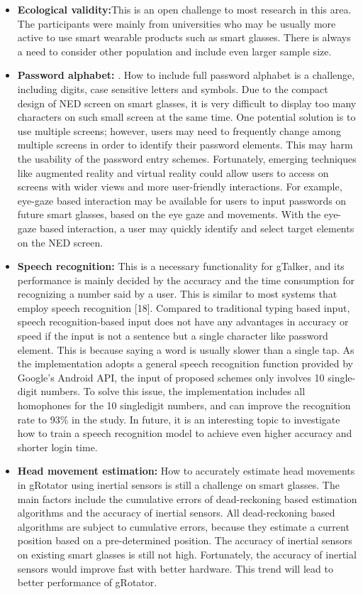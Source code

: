 \documentclass[12pt,a4paper,oneside]{report}
\begin{document}
\begin{itemize}
    \item \textbf{Ecological validity:}This is an open challenge to most
research in this area. The participants were
mainly from universities who may be usually more active to
use smart wearable products such as smart glasses. There is
always a need to consider other population and include even
larger sample size.
    \item \textbf{Password alphabet:} . How to include full password alphabet
is a challenge, including digits, case sensitive letters and
symbols. Due to the compact design of NED screen on smart
glasses, it is very difficult to display too many characters on
such small screen at the same time. One potential solution
is to use multiple screens; however, users may need to frequently change among multiple screens in order to identify
their password elements. This may harm the usability of the
password entry schemes. Fortunately, emerging techniques like
augmented reality and virtual reality could allow users to access on screens with wider views and more user-friendly
interactions. For example, eye-gaze based interaction may be
available for users to input passwords on future smart glasses,
based on the eye gaze and movements. With the eye-gaze
based interaction, a user may quickly identify and select target
elements on the NED screen.

\item \textbf{Speech recognition:} This is a necessary functionality for
gTalker, and its performance is mainly decided by the accuracy
and the time consumption for recognizing a number said by
a user. This is similar to most systems that employ speech
recognition [18]. Compared to traditional typing based input,
speech recognition-based input does not have any advantages
in accuracy or speed if the input is not a sentence but a
single character like password element. This is because
saying a word is usually slower than a single tap. As the
implementation adopts a general speech recognition function
provided by Google’s Android API, the input of proposed schemes
only involves 10 single-digit numbers. To solve this issue, the
implementation includes all homophones for the 10 singledigit numbers, and can improve the recognition rate to 93\%
in the study. In future, it is an interesting topic to investigate
how to train a speech recognition model to achieve even higher
accuracy and shorter login time.

\item \textbf{Head movement estimation:} How to accurately estimate
head movements in gRotator using inertial sensors is still
a challenge on smart glasses. The main factors include the
cumulative errors of dead-reckoning based estimation algorithms and the accuracy of inertial sensors. All dead-reckoning
based algorithms are subject to cumulative errors, because
they estimate a current position based on a pre-determined
position. The accuracy of inertial sensors on existing
smart glasses is still not high. Fortunately, the accuracy of
inertial sensors would improve fast with better hardware. This
trend will lead to better performance of gRotator.
\end{itemize}
\end{document}
